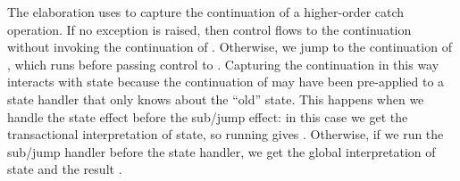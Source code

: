 %
The elaboration uses  to capture the continuation of a higher-order \ac{catch} operation.
If no exception is raised, then control flows to the continuation  without invoking the continuation of .
Otherwise, we jump to the continuation of , which runs  before passing control to .
Capturing the continuation in this way interacts with state because the continuation of  may have been pre-applied to a state handler that only knows about the ``old'' state.
This happens when we handle the state effect before the sub/jump effect: in this case we get the transactional interpretation of state, so running  gives .
Otherwise, if we run the sub/jump handler before the state handler, we get the global interpretation of state and the result .
%
\begin{code}[hide]%
%
\>[6]\<%
\\
%
\>[6]\<%
\\
%
\>[6]\<%
\\
%
\\[\AgdaEmptyExtraSkip]%
\>[0][@{}l@{\AgdaIndent{3}}]%
\>[4]\AgdaSpace{}%
\AgdaModule{\AgdaUnderscore{}}\AgdaSpace{}%
\<%
\\
\>[4][@{}l@{\AgdaIndent{0}}]%
\>[6]\AgdaSpace{}%
\AgdaSpace{}%
\AgdaSpace{}%
\AgdaSymbol{(}\AgdaSymbol{;}\AgdaSpace{}%
\AgdaOperator{\AgdaFunction{\AgdaUnderscore{}>>\AgdaUnderscore{}}}\AgdaSymbol{)}\<%
\\
%
\>[6]\AgdaSpace{}%
\AgdaSpace{}%
\AgdaSpace{}%
\AgdaSpace{}%
\AgdaSymbol{(}\AgdaSymbol{;}\AgdaSpace{}%
\AgdaOperator{\AgdaPrimitive{\AgdaUnderscore{}+\AgdaUnderscore{}}}\AgdaSymbol{)}\<%
\\
%
\>[6]\AgdaSpace{}%
\AgdaSpace{}%
\AgdaSpace{}%
\AgdaSpace{}%
\<%
\\
\>[0]\<%
\\
%
\>[6]%
\>[1832I]\AgdaSymbol{:}\AgdaSpace{}%
\AgdaSpace{}%
\AgdaSpace{}%
\AgdaSymbol{:}\AgdaSpace{}%
\AgdaSpace{}%
\<%
\\

\end{code}
